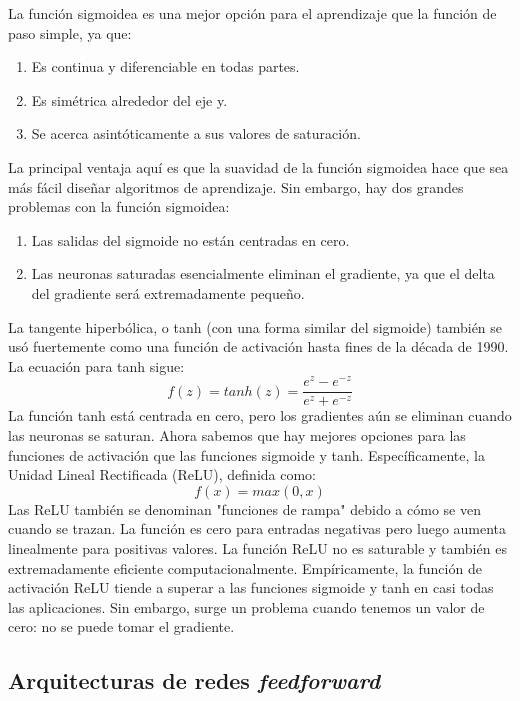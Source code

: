 \documentclass[a4paper,12pt]{article}
\begin{document}
La función sigmoidea es una mejor opción para el aprendizaje que la función de paso simple, ya que:
\begin{enumerate}
\item Es continua y diferenciable en todas partes.
\item Es simétrica alrededor del eje y.
\item Se acerca asintóticamente a sus valores de saturación.
\end{enumerate}
La principal ventaja aquí es que la suavidad de la función sigmoidea hace que sea más fácil diseñar algoritmos de aprendizaje. Sin embargo, hay dos grandes problemas con la función sigmoidea:
\begin{enumerate}
\item Las salidas del sigmoide no están centradas en cero.
\item Las neuronas saturadas esencialmente eliminan el gradiente, ya que el delta del gradiente será extremadamente pequeño.
\end{enumerate}

La tangente hiperbólica, o tanh (con una forma similar del sigmoide) también se usó fuertemente como una función de activación hasta fines de la década de 1990.
La ecuación para tanh sigue:
\begin{equation}
f(z) = tanh(z) = \frac{e^z - e^{-z}}{e^z + e^{-z}}
\end{equation}
La función tanh está centrada en cero, pero los gradientes aún se eliminan cuando las neuronas se saturan.
Ahora sabemos que hay mejores opciones para las funciones de activación que las funciones sigmoide y tanh. Específicamente, la Unidad Lineal Rectificada (ReLU), definida como:
\begin{equation}
f(x) = max(0, x)
\end{equation}
Las ReLU también se denominan "funciones de rampa" debido a cómo se ven cuando se trazan. La función es cero para entradas negativas pero luego aumenta linealmente para positivas valores. La función ReLU no es saturable y también es extremadamente  eficiente computacionalmente.
Empíricamente, la función de activación ReLU tiende a superar a las funciones sigmoide y tanh en casi todas las aplicaciones. Sin embargo, surge un problema cuando tenemos un valor de cero: no se puede tomar el gradiente.

\subsection{Arquitecturas de redes \textit{feedforward}}
\end{document}
